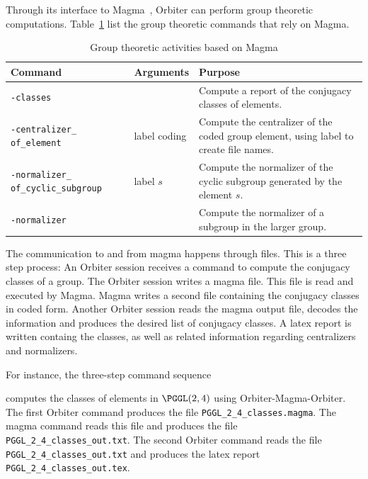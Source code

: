 Through its interface to Magma~\cite{Magma}, Orbiter can perform group theoretic computations. 
Table~\ref{tab:grouptasks:magma} list the group theoretic commands that rely on Magma.
\begin{table}
\begin{center}
\begin{tabular}{|p{4cm}|p{3cm}|p{8cm}|}
\hline
Command & Arguments & Purpose \\
\hline
\hline
\verb'-classes' & & Compute a report of the conjugacy classes of elements. \\
\hline
\verb'-centralizer_' \verb'of_element' & label coding & Compute the centralizer of the coded group element, using label to create file names. \\
\hline
\verb'-normalizer_' \verb'of_cyclic_subgroup' & label $s$ & 
Compute the normalizer of the cyclic subgroup generated by the element $s$. \\
\hline
\verb'-normalizer' & & Compute the normalizer of a subgroup in the larger group. \\
\hline
\end{tabular}
\end{center}
\caption{\label{tab:grouptasks:magma}Group theoretic activities based on Magma}
\end{table}
The communication to and from magma happens through files. This is a three step process: 
An Orbiter session receives a command to compute the conjugacy classes of a group.
The Orbiter session writes a magma file. 
This file is read and executed by Magma. 
Magma writes a second file containing the conjugacy classes in coded form.
Another Orbiter session reads the magma output file, decodes the information and produces the desired list of conjugacy classes. 
A latex report is written containg the classes, as well as related information regarding centralizers and normalizers. 

\bigskip

For instance, the three-step command sequence  
{\tt

}
computes the classes of elements in $\PGGL(2,4)$
using Orbiter-Magma-Orbiter. 
The first Orbiter command produces the file \verb'PGGL_2_4_classes.magma'.
The magma command reads this file and produces the file \verb'PGGL_2_4_classes_out.txt'. 
The second Orbiter command reads the file \verb'PGGL_2_4_classes_out.txt' and produces the latex report 
\verb'PGGL_2_4_classes_out.tex'.

